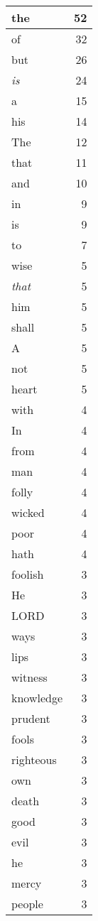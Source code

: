 \begin{center}
\begin{longtable}{l|r}
the & 52\\ \hline 
of & 32\\ \hline 
but & 26\\ \hline 
\emph{is} & 24\\ \hline 
a & 15\\ \hline 
his & 14\\ \hline 
The & 12\\ \hline 
that & 11\\ \hline 
and & 10\\ \hline 
in & 9\\ \hline 
is & 9\\ \hline 
to & 7\\ \hline 
wise & 5\\ \hline 
\emph{that} & 5\\ \hline 
him & 5\\ \hline 
shall & 5\\ \hline 
A & 5\\ \hline 
not & 5\\ \hline 
heart & 5\\ \hline 
with & 4\\ \hline 
In & 4\\ \hline 
from & 4\\ \hline 
man & 4\\ \hline 
folly & 4\\ \hline 
wicked & 4\\ \hline 
poor & 4\\ \hline 
hath & 4\\ \hline 
foolish & 3\\ \hline 
He & 3\\ \hline 
LORD & 3\\ \hline 
ways & 3\\ \hline 
lips & 3\\ \hline 
witness & 3\\ \hline 
knowledge & 3\\ \hline 
prudent & 3\\ \hline 
fools & 3\\ \hline 
righteous & 3\\ \hline 
own & 3\\ \hline 
death & 3\\ \hline 
good & 3\\ \hline 
evil & 3\\ \hline 
he & 3\\ \hline 
mercy & 3\\ \hline 
people & 3\\ \hline 

\end{longtable}
\end{center}
